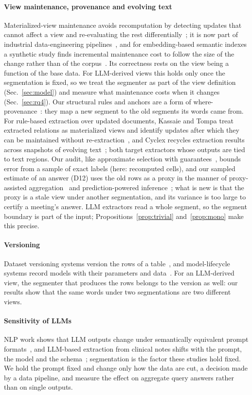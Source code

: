 \documentclass[conference]{IEEEtran}
\begin{document}
\paragraph*{View maintenance, provenance and evolving text} Materialized-view maintenance avoids recomputation by
detecting updates that cannot affect a view and re-evaluating the rest differentially~\cite{blakeley86}; it is now
part of industrial data-engineering pipelines~\cite{enzyme}, and for embedding-based semantic indexes a synthetic
study finds incremental maintenance cost to follow the size of the change rather than of the corpus~\cite{costchange}. Its correctness rests on the view being a function of
the base data. For LLM-derived views this holds only once the segmentation is fixed, so we treat the segmenter as part
of the view definition (Sec.~\ref{sec:model}) and measure what maintenance costs when it changes
(Sec.~\ref{sec:rq4}). Our structural rules and anchors are a form of where-provenance~\cite{whywhere}: they map a
new segment to the old segments its words came from. For rule-based extraction over updated documents, Kassaie and Tompa treat extracted relations as materialized
views and identify updates after which they can be maintained without re-extraction~\cite{kassaie23}, and Cyclex
recycles extraction results across snapshots of evolving text~\cite{cyclex}; both target extractors whose outputs are
tied to text regions. Our audit, like approximate selection with guarantees~\cite{supg}, bounds error from a sample of
exact labels (here: recomputed cells), and our sampled estimate of an answer (D12) uses the old rows as a proxy in the
manner of proxy-assisted aggregation~\cite{blazeit,abae} and prediction-powered inference~\cite{ppi}; what is new is
that the proxy is a stale view under another segmentation, and its variance is too large to certify a meeting's
answer. LLM extractors read a whole
segment, so the segment boundary is part of the input; Propositions~\ref{prop:trivial} and~\ref{prop:mono} make this
precise.
\paragraph*{Versioning} Dataset versioning systems version the rows of a table~\cite{decibel,orpheusdb}, and
model-lifecycle systems record models with their parameters and data~\cite{modelhub}. For an LLM-derived view, the
segmenter that produces the rows belongs to the version as well: our results show that the same words under two
segmentations are two different views.
\paragraph*{Sensitivity of LLMs} NLP work shows that LLM outputs change under semantically equivalent prompt
formats~\cite{sclar}, and LLM-based extraction from clinical notes shifts with the prompt, the model and the
schema~\cite{murin}; segmentation is the factor these studies hold fixed. We hold the prompt fixed and change only how the data are cut, a decision made by a data
pipeline, and measure the effect on aggregate query answers rather than on single outputs.
\end{document}
